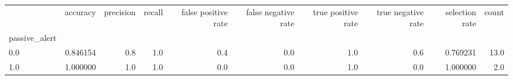 \begin{tabular}{lrrrrrrrrr}
\toprule
{} &  accuracy &  precision &  recall &  false positive rate &  false negative rate &  true positive rate &  true negative rate &  selection rate &  count \\
passive\_alert &           &            &         &                      &                      &                     &                     &                 &        \\
\midrule
0.0           &  0.846154 &        0.8 &     1.0 &                  0.4 &                  0.0 &                 1.0 &                 0.6 &        0.769231 &   13.0 \\
1.0           &  1.000000 &        1.0 &     1.0 &                  0.0 &                  0.0 &                 1.0 &                 0.0 &        1.000000 &    2.0 \\
\bottomrule
\end{tabular}
